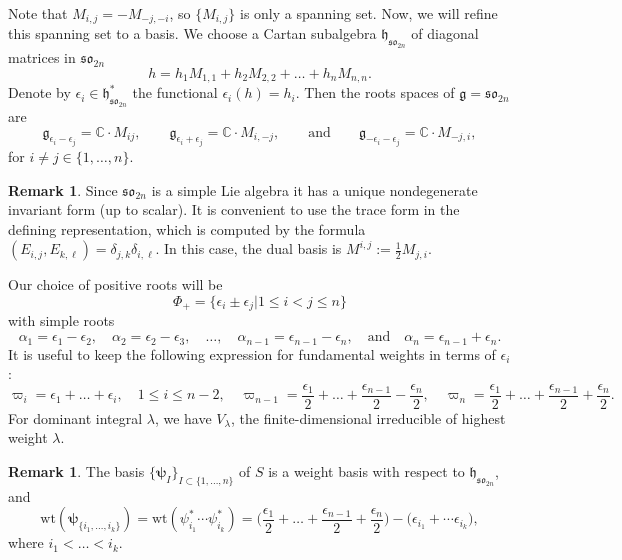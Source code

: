 \documentclass[10pt]{amsart}
\numberwithin{equation}{section}
\theoremstyle{definition}
\newtheorem{remark}[theorem]{Remark}
\def\C{{\mathbb C}}
\newcommand{\son}[1][2n]{\mathfrak{so}_{#1}}
\newcommand{\wt}{\mathrm{wt}}
\newcommand{\g}{\mathfrak{g}}
\newcommand{\h}{\mathfrak{h}}
\newcommand{\hwp}{\boldsymbol{\psi}}
\begin{document}
Note that $M_{i,j} = -M_{-j,-i}$, so $\{M_{i,j}\}$ is only a spanning set. Now, we will refine this spanning set to a basis. We choose a Cartan subalgebra $\h_{\son[2n]}$ of diagonal matrices in $\son[2n]$
\begin{equation}\label{eq:basisso2ncartan}
h=h_{1}M_{1,1} + h_2M_{2,2} + \dots + h_nM_{n,n}.
\end{equation}
Denote by $\epsilon_i \in \h_{\son[2n]}^*$ the functional $\epsilon_i(h) = h_i$. Then the roots spaces of $\g = \son[2n]$ are
\begin{equation}\label{eq:basisso2nroots}
		\g_{\epsilon_i - \epsilon_j} = \C\cdot M_{ij}, \qquad \g_{\epsilon_i + \epsilon_j} = \C\cdot M_{i,-j}, \qquad\text{and} \qquad \g_{-\epsilon_i-\epsilon_j} = \C\cdot M_{-j,i},
\end{equation}
		for $i\neq j\in\{1, \dots, n\}$. 

\begin{remark}\label{rem:dualmij}
    Since $\son$ is a simple Lie algebra it has a unique nondegenerate invariant form (up to scalar). It is convenient to use the trace form in the defining representation, which is computed by the formula $(E_{i,j},E_{k,\ell})=\delta_{j,k}\delta_{i,\ell}$. In this case, the dual basis is $M^{i,j}:=\frac{1}{2}M_{j,i}$.
\end{remark}
        
        Our choice of positive roots will be
		\[
		\Phi_+ = \{ \epsilon_i \pm \epsilon_j | 1\le i< j\le n\}
		\]
		with simple roots
		\[
		\alpha_1 = \epsilon_1 - \epsilon_2,\quad \alpha_2 = \epsilon_2 - \epsilon_3,\quad \dots, \quad  \alpha_{n-1} = \epsilon_{n-1} - \epsilon_n, \quad \text{and} \quad \alpha_n = \epsilon_{n-1} + \epsilon_n.
		\]
It is useful to keep the following expression for fundamental weights in terms of $\epsilon_i$:
\[
\varpi_{i}=\epsilon_1+\dots + \epsilon_{i},\quad  1\le i\le n-2, \quad \varpi_{n-1}=\frac{\epsilon_1}{2}+\dots+\frac{\epsilon_{n-1}}{2}-\frac{\epsilon_{n}}{2}, \quad \varpi_{n}=\frac{\epsilon_1}{2}+\dots+\frac{\epsilon_{n-1}}{2}+\frac{\epsilon_{n}}{2}.
\]
For dominant integral $\lambda$, we have $V_{\lambda}$, the finite-dimensional irreducible of highest weight $\lambda$.

\begin{remark}
The basis $\{\hwp_I\}_{I\subset\{1, \dots, n\}}$ of $S$ is a weight basis with respect to $\h_{\son[2n]}$, and
\[
\wt(\hwp_{\{i_1, \dots , i_k\}}) = \wt(\psi^*_{i_1}\cdots \psi^*_{i_k}) = \big(\frac{\epsilon_1}{2}+\dots+\frac{\epsilon_{n-1}}{2}+\frac{\epsilon_{n}}{2}\big) - \big(\epsilon_{i_1} + \cdots \epsilon_{i_k}\big),
\]
where $i_1 < \dots < i_k$.
\end{remark}
\end{document}
